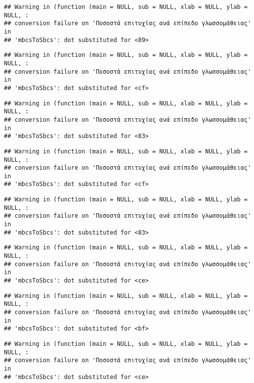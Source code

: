 \documentclass[
]{article}
\begin{document}
\begin{verbatim}
## Warning in (function (main = NULL, sub = NULL, xlab = NULL, ylab = NULL, :
## conversion failure on 'Ποσοστά επιτυχίας ανά επίπεδο γλωσσομάθειας' in
## 'mbcsToSbcs': dot substituted for <89>
\end{verbatim}

\begin{verbatim}
## Warning in (function (main = NULL, sub = NULL, xlab = NULL, ylab = NULL, :
## conversion failure on 'Ποσοστά επιτυχίας ανά επίπεδο γλωσσομάθειας' in
## 'mbcsToSbcs': dot substituted for <cf>
\end{verbatim}

\begin{verbatim}
## Warning in (function (main = NULL, sub = NULL, xlab = NULL, ylab = NULL, :
## conversion failure on 'Ποσοστά επιτυχίας ανά επίπεδο γλωσσομάθειας' in
## 'mbcsToSbcs': dot substituted for <83>
\end{verbatim}

\begin{verbatim}
## Warning in (function (main = NULL, sub = NULL, xlab = NULL, ylab = NULL, :
## conversion failure on 'Ποσοστά επιτυχίας ανά επίπεδο γλωσσομάθειας' in
## 'mbcsToSbcs': dot substituted for <cf>
\end{verbatim}

\begin{verbatim}
## Warning in (function (main = NULL, sub = NULL, xlab = NULL, ylab = NULL, :
## conversion failure on 'Ποσοστά επιτυχίας ανά επίπεδο γλωσσομάθειας' in
## 'mbcsToSbcs': dot substituted for <83>
\end{verbatim}

\begin{verbatim}
## Warning in (function (main = NULL, sub = NULL, xlab = NULL, ylab = NULL, :
## conversion failure on 'Ποσοστά επιτυχίας ανά επίπεδο γλωσσομάθειας' in
## 'mbcsToSbcs': dot substituted for <ce>
\end{verbatim}

\begin{verbatim}
## Warning in (function (main = NULL, sub = NULL, xlab = NULL, ylab = NULL, :
## conversion failure on 'Ποσοστά επιτυχίας ανά επίπεδο γλωσσομάθειας' in
## 'mbcsToSbcs': dot substituted for <bf>
\end{verbatim}

\begin{verbatim}
## Warning in (function (main = NULL, sub = NULL, xlab = NULL, ylab = NULL, :
## conversion failure on 'Ποσοστά επιτυχίας ανά επίπεδο γλωσσομάθειας' in
## 'mbcsToSbcs': dot substituted for <ce>
\end{verbatim}
\end{document}

